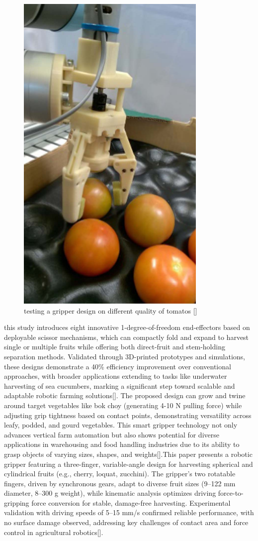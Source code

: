 \begin{figure}
    \centering
    \includegraphics[width=0.5\linewidth]{pictures/tomato_gripper.png}
    \caption{testing a gripper design on different quality of tomatos [\cite{russo2017design}]}
    \label{fig:enter-label}
\end{figure}


this study introduces eight innovative 1-degree-of-freedom end-effectors based on deployable scissor mechanisms, which can compactly fold and expand to harvest single or multiple fruits while offering both direct-fruit and stem-holding separation methods. Validated through 3D-printed prototypes and simulations, these designs demonstrate a 40\% efficiency improvement over conventional approaches, with broader applications extending to tasks like underwater harvesting of sea cucumbers, marking a significant step toward scalable and adaptable robotic farming solutions[\cite{differentDesign}]. The proposed design can grow and twine around target vegetables like bok choy (generating 4-10 N pulling force) while adjusting grip tightness based on contact points, demonstrating versatility across leafy, podded, and gourd vegetables. This smart gripper technology not only advances vertical farm automation but also shows potential for diverse applications in warehousing and food handling industries due to its ability to grasp objects of varying sizes, shapes, and weights[\cite{gripper3}].This paper presents a robotic gripper featuring a three-finger, variable-angle design for harvesting spherical and cylindrical fruits (e.g., cherry, loquat, zucchini). The gripper’s two rotatable fingers, driven by synchronous gears, adapt to diverse fruit sizes (9–122 mm diameter, 8–300 g weight), while kinematic analysis optimizes driving force-to-gripping force conversion for stable, damage-free harvesting. Experimental validation with driving speeds of 5–15 mm/s confirmed reliable performance, with no surface damage observed, addressing key challenges of contact area and force control in agricultural robotics[\cite{multipurpuse_gripper}].

